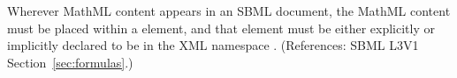 Wherever MathML content appears in an SBML document, the MathML content
must be placed within a  element, and that  element
must be either explicitly or implicitly declared to be in the XML namespace
.  (References: SBML L3V1
Section~\ref{sec:formulas}.) 
